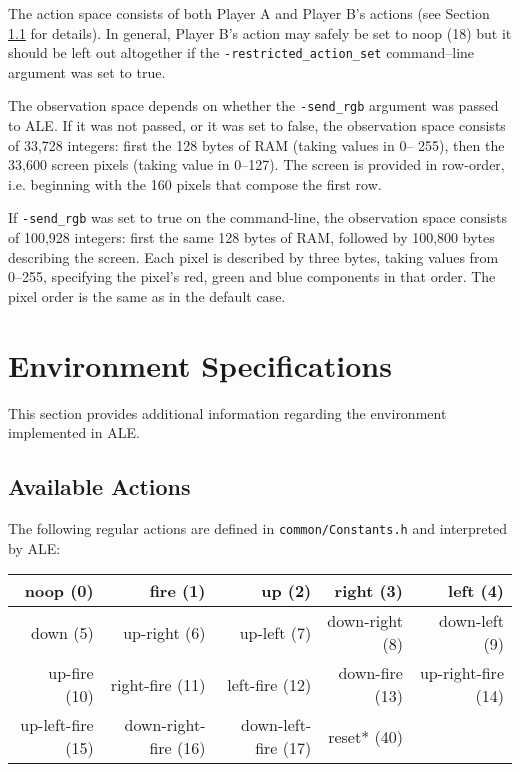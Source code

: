 \documentclass[12pt]{article}
\begin{document}
The action space consists of both Player A and Player B's actions (see Section 
\ref{sec:available_actions}
for details). In general, Player B's action may safely be set to noop (18) but it should be left out
altogether if the \verb+-restricted_action_set+ command--line argument was set to true. 

The observation space depends on whether the \verb+-send_rgb+ argument was passed to ALE. If it was
not passed,  or it was set to false, the observation space consists of 33,728 integers: first the
128 bytes of RAM (taking values in 0-- 255), then the 33,600 screen pixels (taking value in 0--127).
The screen is provided in row-order, i.e. beginning with the 160 pixels that compose the first row.

 If \verb+-send_rgb+ was set to true on the command-line, the observation space consists of 100,928 
 integers: first the same 128 bytes of RAM, followed by 100,800 bytes describing the screen.
 Each pixel is described by three bytes, taking values from 0--255, specifying the pixel's 
 red, green and blue components in that order. The pixel order is the same as in the default
 case.

\section{Environment Specifications}\label{sec:environment_specifications}

This section provides additional information regarding the environment implemented in ALE.

\subsection{Available Actions}\label{sec:available_actions}

The following regular actions are defined in \verb+common/Constants.h+ and interpreted by ALE:

\begin{center}
\begin{tabular}{|r|r|r|r|r|}
\hline
noop (0) & fire (1) & up (2) & right (3) & left (4) \\
\hline
down (5) & up-right (6) & up-left (7) & down-right (8) & down-left (9) \\
\hline
up-fire (10) & right-fire (11) & left-fire (12) & down-fire (13) & up-right-fire (14) \\
\hline
up-left-fire (15) & down-right-fire (16) & down-left-fire (17) & reset* (40) & \\
\hline
\end{tabular}
\end{center}
\end{document}
